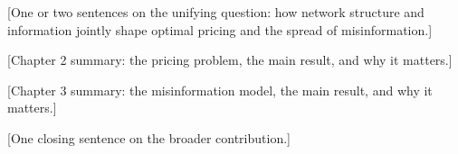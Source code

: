 

[One or two sentences on the unifying question: how network structure and
information jointly shape optimal pricing and the spread of misinformation.]

[Chapter 2 summary: the pricing problem, the main result, and why it matters.]

[Chapter 3 summary: the misinformation model, the main result, and why it matters.]

[One closing sentence on the broader contribution.]
